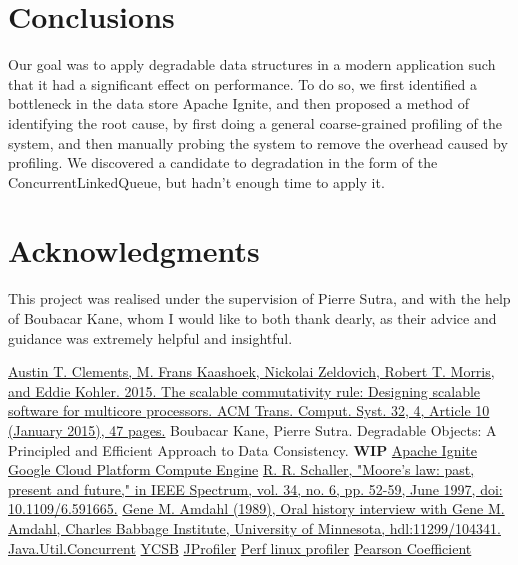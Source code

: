 \documentclass[conference]{IEEEtran}
\begin{document}
\bigbreak
\section{Conclusions}
Our goal was to apply degradable data structures in a modern application such that it had a significant effect on performance.
To do so, we first identified a bottleneck in the data store Apache Ignite, and then proposed a method of identifying the root cause, by first doing a general coarse-grained profiling of the system, and then manually probing the system to remove the overhead caused by profiling. We discovered a candidate to degradation in the form of the ConcurrentLinkedQueue, but hadn't enough time to apply it.


\bigbreak

\section{Acknowledgments}
This project was realised under the supervision of Pierre Sutra, and with the help of Boubacar Kane, whom I would like to both thank dearly, as their advice and guidance was extremely helpful and insightful. 

\bigbreak

\begin{thebibliography}{00}
 \href{https://dl.acm.org/doi/10.1145/2699681}{Austin T. Clements, M. Frans Kaashoek, Nickolai Zeldovich, Robert T. Morris, and Eddie Kohler. 2015. The scalable commutativity rule: Designing scalable software for multicore processors. ACM Trans. Comput. Syst. 32, 4, Article 10 (January 2015), 47 pages.}
 Boubacar Kane, Pierre Sutra. Degradable Objects: A Principled and Efficient Approach to Data Consistency. \textbf{WIP}
 \href{https://ignite.apache.org/docs/latest/}{Apache Ignite}
 \href{https://cloud.google.com/compute/docs}{Google Cloud Platform Compute Engine}
 \href{https://ieeexplore.ieee.org/document/591665}{R. R. Schaller, "Moore's law: past, present and future," in IEEE Spectrum, vol. 34, no. 6, pp. 52-59, June 1997, doi: 10.1109/6.591665.}
 \href{https://conservancy.umn.edu/handle/11299/104341}{Gene M. Amdahl (1989), Oral history interview with Gene M. Amdahl, Charles Babbage Institute, University of Minnesota, hdl:11299/104341.}
 \href{https://docs.oracle.com/javase/8/docs/api/index.html?java/util/concurrent/package-summary.html}{Java.Util.Concurrent}
 \href{https://ycsb.site}{YCSB}
 \href{https://www.ej-technologies.com/products/jprofiler/overview.html}{JProfiler}
 \href{https://perf.wiki.kernel.org/index.php/Main_Page}{Perf linux profiler}
 \href{https://libguides.library.kent.edu/SPSS/PearsonCorr}{Pearson Coefficient}
\end{thebibliography}

\vspace{12pt}
\end{document}
